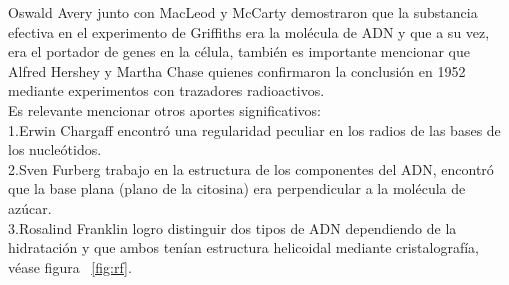 Oswald Avery junto con MacLeod y McCarty demostraron que la substancia efectiva en el experimento de Griffiths era la molécula de ADN y que a su vez, era el portador de genes en la célula, también es importante mencionar que Alfred Hershey y Martha Chase quienes confirmaron la conclusión en 1952 mediante experimentos con trazadores radioactivos\cite{Thormod}.\\

Es relevante mencionar otros aportes significativos: \\
1.Erwin Chargaff encontró una regularidad peculiar en los radios de las bases de los nucleótidos.\\
2.Sven Furberg trabajo en la estructura de los componentes del ADN, encontró que la base plana (plano de la citosina) era perpendicular a la molécula de azúcar.\\
3.Rosalind Franklin logro distinguir dos tipos de ADN dependiendo de la hidratación y que ambos tenían estructura helicoidal mediante cristalografía, véase figura ~\ref{fig:rf}.\\

